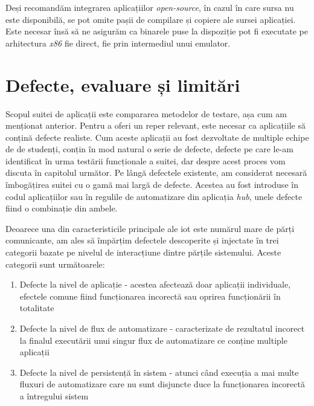 Deși recomandăm integrarea aplicațiilor \textit{open-source}, în cazul în care sursa nu este disponibilă, se pot omite pașii de compilare și copiere ale sursei aplicației. Este necesar însă să ne asigurăm ca binarele puse la dispoziție pot fi executate pe arhitectura \textit{x86} fie direct, fie prin intermediul unui emulator.

\section{Defecte, evaluare și limitări}

Scopul suitei de aplicații este compararea metodelor de testare, așa cum am menționat anterior. Pentru a oferi un reper relevant, este necesar ca aplicațiile să conțină defecte realiste. Cum aceste aplicații au fost dezvoltate de multiple echipe de de studenți, conțin în mod natural o serie de defecte, defecte pe care le-am identificat în urma testării funcționale a suitei, dar despre acest proces vom discuta în capitolul următor. Pe lângă defectele existente, am considerat necesară îmbogățirea suitei cu o gamă mai largă de defecte. Acestea au fost introduse în codul aplicațiilor sau în regulile de automatizare din aplicația \textit{hub}, unele defecte fiind o combinație din ambele.

Deoarece una din caracteristicile principale ale \acrshort{iot} este numărul mare de părți comunicante, am ales să împărțim defectele descoperite și injectate în trei categorii bazate pe nivelul de interacțiune dintre părțile sistemului. Aceste categorii sunt următoarele:

\begin{enumerate}
    \item Defecte la nivel de aplicație - acestea afectează doar aplicații individuale, efectele comune fiind funcționarea incorectă sau oprirea funcționării în totalitate
    \item Defecte la nivel de flux de automatizare - caracterizate de rezultatul incorect la finalul executării unui singur flux de automatizare ce conține multiple aplicații
    \item Defecte la nivel de persistență în sistem - atunci când execuția a mai multe fluxuri de automatizare care nu sunt disjuncte duce la funcționarea incorectă a întregului sistem
\end{enumerate}

